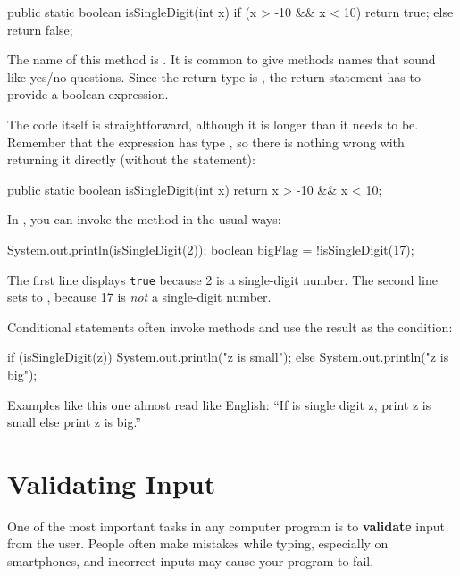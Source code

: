 \begin{code}
public static boolean isSingleDigit(int x) {
    if (x > -10 && x < 10) {
        return true;
    } else {
        return false;
    }
}
\end{code}

The name of this method is .
It is common to give  methods names that sound like yes/no questions.
Since the return type is , the return statement has to provide a boolean expression.

The code itself is straightforward, although it is longer than it needs to be.
Remember that the expression  has type , so there is nothing wrong with returning it directly (without the  statement):

\begin{code}
public static boolean isSingleDigit(int x) {
    return x > -10 && x < 10;
}
\end{code}

In , you can invoke the method in the usual ways:

\begin{code}
System.out.println(isSingleDigit(2));
boolean bigFlag = !isSingleDigit(17);
\end{code}

The first line displays {\tt true} because 2 is a single-digit number.
The second line sets  to , because 17 is {\em not} a single-digit number.

Conditional statements often invoke  methods and use the result as the condition:

\begin{code}
if (isSingleDigit(z)) {
    System.out.println("z is small");
} else {
    System.out.println("z is big");
}
\end{code}

Examples like this one almost read like English:
``If is single digit z, print z is small else print z is big.''


\section{Validating Input}
\label{validate}


One of the most important tasks in any computer program is to {\bf validate} input from the user.
People often make mistakes while typing, especially on smartphones, and incorrect inputs may cause your program to fail.

